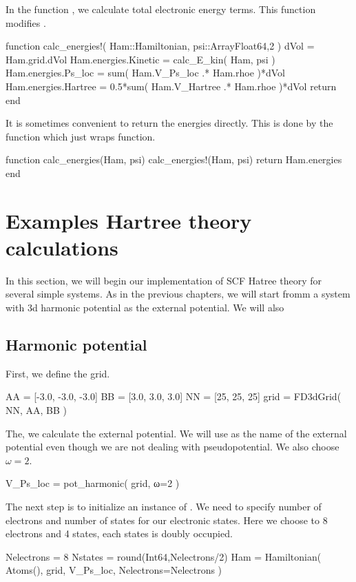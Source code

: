 In the function , we calculate total electronic energy terms.
This function modifies .
\begin{juliacode}
function calc_energies!( Ham::Hamiltonian, psi::Array{Float64,2} )
  dVol = Ham.grid.dVol
  Ham.energies.Kinetic = calc_E_kin( Ham, psi )
  Ham.energies.Ps_loc = sum( Ham.V_Ps_loc .* Ham.rhoe )*dVol
  Ham.energies.Hartree = 0.5*sum( Ham.V_Hartree .* Ham.rhoe )*dVol
  return
end
\end{juliacode}
It is sometimes convenient to return the energies directly. This is done by
the function  which just wraps 
function.
\begin{juliacode}
function calc_energies(Ham, psi)
  calc_energies!(Ham, psi)
  return Ham.energies
end
\end{juliacode}


\section{Examples Hartree theory calculations}

In this section, we will begin our implementation of SCF Hatree theory for several
simple systems.
As in the previous chapters, we will start fromm a system with 3d harmonic potential as the
external potential. We will also 

\subsection{Harmonic potential}

First, we define the grid.
\begin{juliacode}
AA = [-3.0, -3.0, -3.0]
BB = [3.0, 3.0, 3.0]
NN = [25, 25, 25]
grid = FD3dGrid( NN, AA, BB )
\end{juliacode}

The, we calculate the external potential. We will use  as the name of
the external potential even though we are not dealing with pseudopotential.
We also choose $\omega=2$.
\begin{juliacode}
V_Ps_loc = pot_harmonic( grid, ω=2 )
\end{juliacode}

The next step is to initialize an instance of . We need to specify
number of electrons and number of states for our electronic states. Here we choose to 8
electrons and 4 states, each states is doubly occupied.
\begin{juliacode}
Nelectrons = 8
Nstates = round(Int64,Nelectrons/2)
Ham = Hamiltonian( Atoms(), grid, V_Ps_loc, Nelectrons=Nelectrons )
\end{juliacode}

